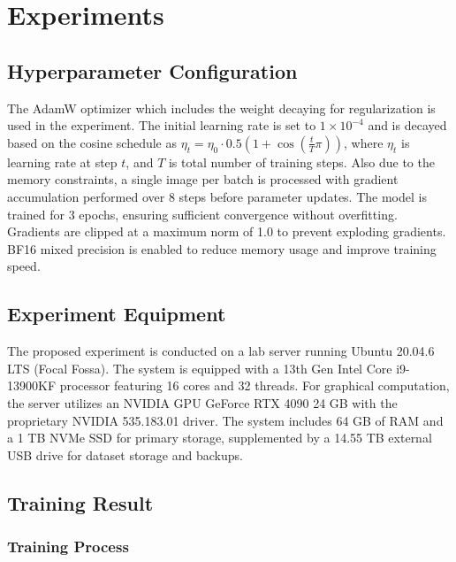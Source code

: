 \section{Experiments}

\subsection{Hyperparameter Configuration}
The AdamW optimizer which includes the weight decaying for regularization is used in the experiment. The initial learning rate is set to $1 \times 10^{-4}$ and is decayed based on the cosine schedule as $\eta_t = \eta_0 \cdot 0.5 \left(1 + \cos\left(\frac{t}{T} \pi\right)\right)$,
where $\eta_t$ is learning rate at step $t$, and $T$ is total number of training steps.
% 
Also due to the memory constraints, a single image per batch is processed with gradient accumulation performed over 8 steps before parameter updates. The model is trained for 3 epochs, ensuring sufficient convergence without overfitting. Gradients are clipped at a maximum norm of 1.0 to prevent exploding gradients. BF16 mixed precision is enabled to reduce memory usage and improve training speed.

\subsection{Experiment Equipment}

The proposed experiment is conducted on a lab server running Ubuntu 20.04.6 LTS (Focal Fossa). The system is equipped with a 13th Gen Intel Core i9-13900KF processor featuring 16 cores and 32 threads. For graphical computation, the server utilizes an NVIDIA GPU GeForce RTX 4090 24 GB with the proprietary NVIDIA 535.183.01 driver. The system includes 64 GB of RAM and a 1 TB NVMe SSD for primary storage, supplemented by a 14.55 TB external USB drive for dataset storage and backups.  

\subsection{Training Result}

\subsubsection{Training Process}

